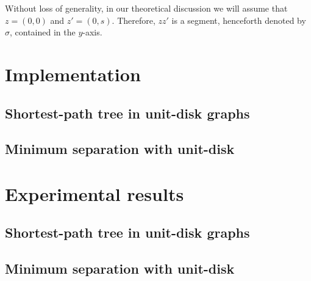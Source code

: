 \documentclass[a4paper,USenglish,numberwithinsect]{lipics}
\begin{document}


Without loss of generality, in our theoretical discussion we will assume
that $z=(0,0)$ and $z'=(0,s)$. Therefore, $zz'$ is a segment, henceforth denoted by $\sigma$,
contained in the $y$-axis.





\section{Implementation}
\label{sec:implementation}

\subsection{Shortest-path tree in unit-disk graphs}
\label{sec:implementation-sptree}

\subsection{Minimum separation with unit-disk}
\label{sec:implementation-separation}



\section{Experimental results}
\label{sec:experiments}

\subsection{Shortest-path tree in unit-disk graphs}
\label{sec:experiments-sptree}

\subsection{Minimum separation with unit-disk}
\label{sec:experiments-separation}

\end{document}
